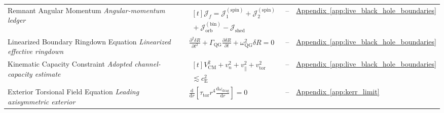 \begin{longtable}{@{} p{4.5cm} p{6cm} c p{4cm} @{}}
{\raggedright Remnant Angular Momentum \newline \textit{Angular-momentum ledger}\par} & {\raggedright $\begin{gathered}[t]\mathcal J_f=\mathcal J_1^{(\mathrm{spin})}+\mathcal J_2^{(\mathrm{spin})} \\ {}+\mathcal J_{\mathrm{orb}}^{(\mathrm{bin})}-\mathcal J_{\mathrm{shed}}\end{gathered}$\par} & -- & {\raggedright \hyperref[app:live_black_hole_boundaries]{Appendix~\ref*{app:live_black_hole_boundaries}}\par} \\

{\raggedright Linearized Boundary Ringdown Equation \newline \textit{Linearized effective ringdown}\par} & {\raggedright $\frac{\partial^2 \delta R}{\partial t^2} + \Gamma_{\mathrm{QG}}\frac{\partial \delta R}{\partial t} + \omega_{\mathrm{QG}}^2\delta R = 0$\par} & -- & {\raggedright \hyperref[app:live_black_hole_boundaries]{Appendix~\ref*{app:live_black_hole_boundaries}}\par} \\

{\raggedright Kinematic Capacity Constraint \newline \textit{Adopted channel-capacity estimate}\par} & {\raggedright $\begin{gathered}[t]V_{\mathrm{CM}}^2+v_n^2+v_\parallel^2+v_{\mathrm{tor}}^2 \\ \lesssim c_{\mathrm E}^2\end{gathered}$\par} & -- & {\raggedright \hyperref[app:live_black_hole_boundaries]{Appendix~\ref*{app:live_black_hole_boundaries}}\par} \\

{\raggedright Exterior Torsional Field Equation \newline \textit{Leading axisymmetric exterior}\par} & {\raggedright $\frac{\mathrm d}{\mathrm dr}\left[\tau_{\mathrm{tor}}r^4\frac{\mathrm d\omega_{\mathrm{drag}}}{\mathrm dr}\right]=0$\par} & -- & {\raggedright \hyperref[app:kerr_limit]{Appendix~\ref*{app:kerr_limit}}\par} \\


\end{longtable}

